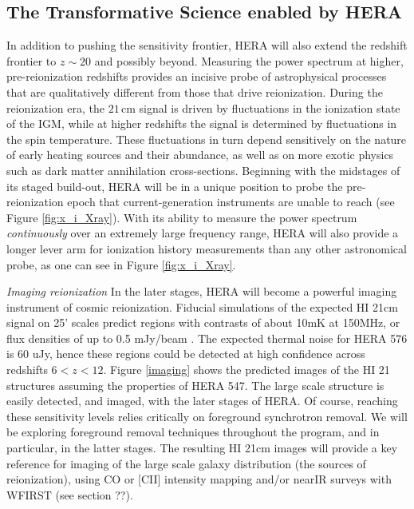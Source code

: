 \documentclass[preprint]{aastex}
\begin{document}
\vspace{-0.25in}
\subsection{The Transformative Science enabled by HERA}


In addition to pushing the sensitivity frontier, HERA will also extend the redshift frontier 
to $z \sim 20$ and possibly beyond.  Measuring the power spectrum at higher, pre-reionization redshifts provides
an incisive probe of astrophysical processes that are qualitatively different from those that
drive reionization.  During the reionization era, the $21\,\textrm{cm}$ signal is driven by
fluctuations in the ionization state of the IGM, while at higher redshifts the signal is determined
by fluctuations in the spin temperature.  These fluctuations in turn depend sensitively on the nature of early heating sources  and their abundance, as well as on more exotic physics such as dark matter annihilation cross-sections.  Beginning with the midstages of its staged build-out, HERA will be in a unique position to probe the pre-reionization epoch that current-generation instruments are unable to reach (see Figure \ref{fig:x_i_Xray}).  With its ability to measure the power spectrum \emph{continuously} over an extremely large frequency range,
HERA will also provide a longer lever arm for ionization history measurements than any other astronomical probe,
as one can see in Figure \ref{fig:x_i_Xray}.

{\sl Imaging reionization} In the later stages, HERA will become a powerful imaging instrument of cosmic reionization. Fiducial simulations of the expected HI 21cm signal on 25' scales predict regions with contrasts of about 10mK at 150MHz, or flux densities of up to 0.5 mJy/beam \citep{mcquinn_et_al2007}. The expected thermal noise for HERA 576 is 60 uJy, hence these regions could be detected at high confidence across redshifts $6<z<12$. Figure \ref{imaging} shows the predicted images of the HI 21 structures  assuming the properties of HERA 547. The large scale structure is easily detected, and imaged, with the later stages of HERA. Of course, reaching these sensitivity levels relies critically on foreground synchrotron removal. We will be exploring foreground removal techniques throughout the program, and in particular, in the latter stages. The resulting HI 21cm images will provide a key reference for imaging of the large scale galaxy distribution (the sources of reionization), using CO or [CII] intensity mapping and/or nearIR surveys with WFIRST (see section ??).
\end{document}
